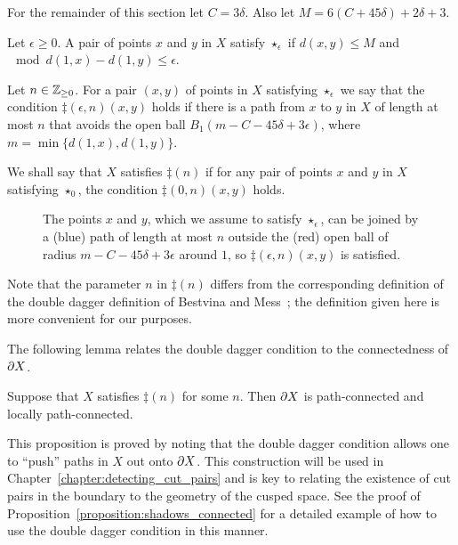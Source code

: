 For the remainder of this section let $C = 3\delta$. 
Also let $M = 6(C + 45\delta) + 2\delta + 3$.

\begin{definition}\cite{dahmanigroves08a}
  Let $\epsilon \geq 0$.
  A pair of points $x$ and $y$ in $X$ satisfy $\star_\epsilon$ if $d(x,y) \leq M$ and $\mod{d(1, x) - d(1, y)} \leq \epsilon$.

  Let $n \in \mathbb{Z}_{\geq 0}$. 
  For a pair $(x, y)$ of points in $X$ satisfying $\star_\epsilon$ we say that the condition $\ddag(\epsilon, n)(x, y)$ holds if there is a path from $x$ to $y$ in $X$ of length at most $n$ that avoids the open ball $B_1(m - C - 45\delta + 3\epsilon)$, where $m = \min\{d(1, x), d(1, y)\}$.

  We shall say that $X$ satisfies $\ddag(n)$ if for any pair of points $x$ and $y$ in $X$ satisfying $\star_0$, the condition $\ddag(0, n)(x, y)$ holds. 
\end{definition}

\begin{figure}[h]
  \begin{center}
    
  \end{center}
  \caption{ The points $x$ and $y$, which we assume to satisfy $\star_\epsilon$, can be joined by a (blue) path of length at most $n$ outside the (red) open ball of radius $m - C - 45\delta + 3\epsilon$ around $1$, so $\ddag(\epsilon, n)(x, y)$ is satisfied.}
  \label{fig:doubledagger}
\end{figure}

\begin{remark}
  Note that the parameter $n$ in $\ddag(n)$ differs from the corresponding definition of the double dagger definition of Bestvina and Mess~\cite{bestvinamess91}; the definition given here is more convenient for our purposes.
\end{remark}

The following lemma relates the double dagger condition to the connectedness of $\partial X$.

\begin{proposition}\cite[Proposition 3.2]{bestvinamess91}
  \label{proposition:ddag_implies_connected}
  Suppose that $X$ satisfies $\ddag(n)$ for some $n$.
  Then $\partial X$ is path-connected and locally path-connected.
\end{proposition}

This proposition is proved by noting that the double dagger condition allows one to ``push'' paths in $X$ out onto $\partial X$.
This construction will be used in Chapter~\ref{chapter:detecting_cut_pairs} and is key to relating the existence of cut pairs in the boundary to the geometry of the cusped space.
See the proof of Proposition~\ref{proposition:shadows_connected} for a detailed example of how to use the double dagger condition in this manner.

